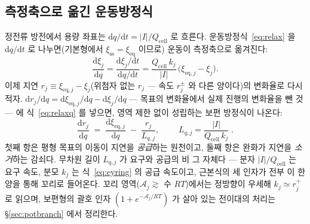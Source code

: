 \documentclass[11pt,a4paper]{article}
\newcommand{\dd}{\mathrm{d}}
\newcommand{\eq}{\mathrm{eq}}
\newcommand{\cell}{\mathrm{cell}}
\newcommand{\sstat}{\mathrm{ss}}
\begin{document}
\subsection{측정축으로 옮긴 운동방정식}
정전류 방전에서 용량 좌표는 $\dd q/\dd t=|I|/Q_\cell$ 로 흐른다. 운동방정식~\eqref{eq:relax} 을
$\dd q/\dd t$ 로 나누면(기본형에서 $\xi_{\sstat}=\xi_{\eq}$ 이므로) 운동이 측정축으로 옮겨진다:
\begin{equation}
\frac{\dd\xi_j}{\dd q}
=\frac{\dd\xi_j/\dd t}{\dd q/\dd t}
=\frac{Q_\cell\,k_j}{|I|}\,\big(\xi_{\eq,j}-\xi_j\big).
\label{eq:relaxq}
\end{equation}
이제 지연 $r_j\equiv\xi_{\eq,j}-\xi_j$(위첨자 없는 $r_j$ — 속도 $r_j^\pm$ 와 다른 양이다)의
변화율로 다시 적자.
$\dd r_j/\dd q=\dd\xi_{\eq,j}/\dd q-\dd\xi_j/\dd q$ — 목표의 변화율에서 실제 진행의 변화율을
뺀 것 — 에 식~\eqref{eq:relaxq} 를 넣으면, 영역 제한 없이 성립하는 보편 방정식이 나온다:
\begin{equation}
\frac{\dd r_j}{\dd q}\;=\;\frac{\dd\xi_{\eq,j}}{\dd q}\;-\;\frac{r_j}{L_{q,j}},\qquad
\boxed{\;L_{q,j}=\frac{|I|}{Q_\cell\,k_j}\;.}
\label{eq:Lq}
\end{equation}
첫째 항은 평형 목표의 이동이 지연을 \emph{공급}하는 원천이고, 둘째 항은 완화가 지연을 \emph{소거}하는
감쇠다. 무차원 길이 $L_{q,j}$ 가 요구와 공급의 비 그 자체다 — 분자 $|I|/Q_\cell$ 는 요구 속도, 분모
$k_j$ 는 식~\eqref{eq:eyring} 의 공급 속도이고, 근본식의 세 인자가 전부 이 한 양을 통해 꼬리로 들어온다.
꼬리 영역($\mathcal A_j\gtrsim$ 수 $RT$)에서는 정방향이 우세해 $k_j\simeq r_j^+$ 로 읽으며, 보편형의 괄호
인자 $(1+e^{-\mathcal A_j/RT})$ 가 살아 있는 전이대의 처리는 \S\ref{sec:potbranch} 에서 정리한다.
\end{document}
